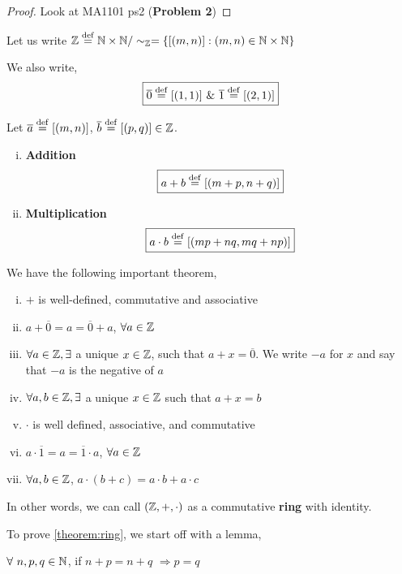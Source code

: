 \documentclass[11pt]{scrartcl}
\begin{document}
	\begin{proof}
		Look at MA1101 ps2 (\textbf{Problem 2})
	\end{proof}

	\begin{definition}
		Let us write $\mathbb Z \overset{\mathrm{def}}{=} \mathbb N \times \mathbb N / \sim_{\mathbb Z} = \{[(m,n)] : (m,n) \in \mathbb N \times \mathbb N\}$
		
		We also write,
		$$\boxed{\overline{0} \overset{\mathrm{def}}{=} [(1,1)]\ \&\ \overline{1} \overset{\mathrm{def}}{=} [(2,1)]}$$
		
		Let $\overline{a} \overset{\mathrm{def}}{=} [(m,n)]$, $\overline{b} \overset{\mathrm{def}}{=} [(p,q)] \in \mathbb Z$.
		\begin{enumerate}[i)]
			\item \textbf{Addition}\\
			$$\boxed{ a + b \overset{\mathrm{def}}{=} [(m+p, n+q)]}$$
			\item \textbf{Multiplication}\\
			$$\boxed{ a \cdot b \overset{\mathrm{def}}{=} [(mp+nq, mq+np)]}$$
		\end{enumerate}
	\end{definition}

	We have the following important theorem,
	
	\begin{theorem}
		\begin{enumerate}[i)]
			\item $+$ is well-defined, commutative and associative
			\item $a+\overline{0} = a = \overline{0} + a$, $\forall a \in \mathbb Z$
			\item $\forall a \in \mathbb Z, \exists$ a unique $x \in \mathbb Z$, such that $a + x = \overline{0}$. We write $-a$ for $x$ and say that $-a$  is  the negative of $a$
			\item $\forall a,b \in \mathbb Z, \exists$ a unique $x \in \mathbb Z$ such that $a+x = b$
			\item $\cdot$ is well defined, associative, and commutative
			\item $a\cdot\overline{1} = a = \overline{1}\cdot a$, $\forall a \in \mathbb Z$
			\item $\forall a,b \in \mathbb Z$, $a\cdot (b+c) = a\cdot b + a\cdot c$
		\end{enumerate}
	\label{theorem:ring}
	\end{theorem}

	\begin{remark}
		In other words, we can call $(\mathbb Z, +, \cdot)$ as a commutative \textbf{ring} with identity.
	\end{remark}

	To prove \ref{theorem:ring}, we start off with a lemma,
	
	\begin{lemma}
		$\forall\ n,p,q \in \mathbb N$, if $n+p = n+q$ $\Rightarrow p=q$
	\end{lemma}
\end{document}
